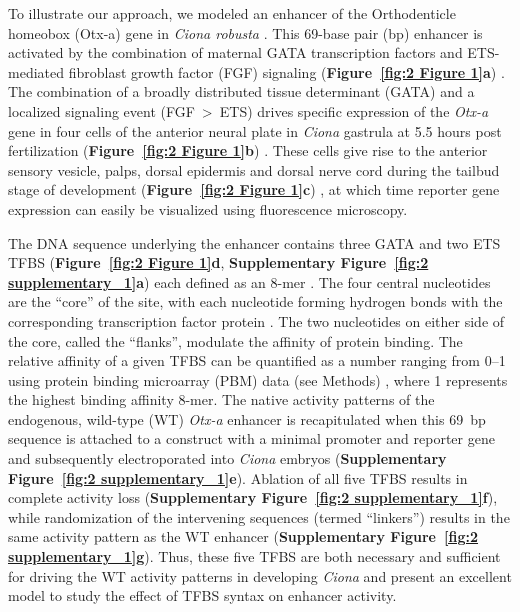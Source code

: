 To illustrate our approach, we modeled an enhancer of the Orthodenticle homeobox (Otx-a) gene in \textit{Ciona robusta} \cite{Delsuc2006-nq}. This 69-base pair (bp) enhancer is activated by the combination of maternal GATA transcription factors and ETS-mediated fibroblast growth factor (FGF) signaling (\textbf{Figure~\ref{fig:2 Figure 1}a}) \cite{Bertrand2003-su,Rothbacher2007-rt,Williaume2021-wk}. The combination of a broadly distributed tissue determinant (GATA) and a localized signaling event (FGF~>~ETS) drives specific expression of the \textit{Otx-a} gene in four cells of the anterior neural plate in \textit{Ciona} gastrula at 5.5 hours post fertilization (\textbf{Figure~\ref{fig:2 Figure 1}b}) \cite{Acampora2005-bo,Beby2013-xq}. These cells give rise to the anterior sensory vesicle, palps, dorsal epidermis and dorsal nerve cord during the tailbud stage of development (\textbf{Figure~\ref{fig:2 Figure 1}c}) \cite{Acampora2005-bo,Beby2013-xq}, at which time reporter gene expression can easily be visualized using fluorescence microscopy.

The DNA sequence underlying the enhancer contains three GATA and two ETS TFBS (\textbf{Figure~\ref{fig:2 Figure 1}d}, \textbf{Supplementary Figure~\ref{fig:2 supplementary_1}a}) each defined as an 8-mer \cite{Bertrand2003-su}. The four central nucleotides are the “core” of the site, with each nucleotide forming hydrogen bonds with the corresponding transcription factor protein \cite{Bates2008-go,Pio1996-gj}. The two nucleotides on either side of the core, called the “flanks”, modulate the affinity of protein binding. The relative affinity of a given TFBS can be quantified as a number ranging from 0--1 using protein binding microarray (PBM) data (see Methods) \cite{Nitta2015-rt,Hume2015-xj,Wei2010-di,Badis2009-hv}, where 1 represents the highest binding affinity 8-mer. The native activity patterns of the endogenous, wild-type (WT) \textit{Otx-a} enhancer is recapitulated when this 69~bp sequence is attached to a construct with a minimal promoter and reporter gene and subsequently electroporated into \textit{Ciona} embryos (\textbf{Supplementary Figure~\ref{fig:2 supplementary_1}e}). Ablation of all five TFBS results in complete activity loss (\textbf{Supplementary Figure~\ref{fig:2 supplementary_1}f}), while randomization of the intervening sequences (termed “linkers”) results in the same activity pattern as the WT enhancer (\textbf{Supplementary Figure~\ref{fig:2 supplementary_1}g}). Thus, these five TFBS are both necessary and sufficient for driving the WT activity patterns in developing \textit{Ciona} and present an excellent model to study the effect of TFBS syntax on enhancer activity.

